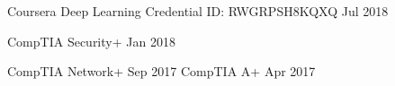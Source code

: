 

\begin{cvhonors}

  \cvhonor
    {Coursera Deep Learning} %
    {Credential ID: RWGRPSH8KQXQ} %
    {} %
    {Jul 2018} %
    
  \cvhonor
    {CompTIA Security+} %
    {} %
    {} %
    {Jan 2018} %

  \cvhonor
    {CompTIA Network+} %
    {} %
    {} %
    {Sep 2017} %
 \cvhonor
    {CompTIA A+} %
    {} %
    {} %
    {Apr 2017} %

\end{cvhonors}
